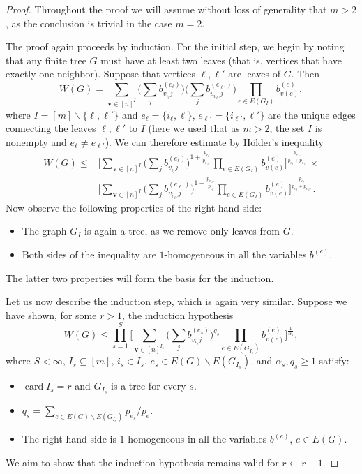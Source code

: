 \documentclass[10pt,reqno]{amsart}
\theoremstyle{definition}
\numberwithin{equation}{section}
\numberwithin{figure}{section}
\numberwithin{table}{section}
\newcommand{\card}{\mathop{\mathrm{card}}}
\begin{document}
\begin{proof}
Throughout the proof we will assume without loss of generality that 
$m>2$, as the conclusion is trivial in the case $m=2$.

The proof again proceeds by induction. For the initial step, we begin by 
noting that any finite tree $G$ must have at least two leaves (that is,
vertices that have exactly one neighbor). Suppose that vertices 
$\ell,\ell'$ are leaves of $G$. Then
$$
        W(G) =
        \sum_{\mathbf{v}\in[n]^{I}}
	\Bigg(
	\sum_j b_{v_{i_\ell}j}^{(e_\ell)}
	\Bigg)
	\Bigg(
	\sum_j b_{v_{i_{\ell'}}j}^{(e_{\ell'})}
	\Bigg)
        \prod_{e\in E(G_{I})}b_{v(e)}^{(e)},
$$
where $I=[m]\backslash\{\ell,\ell'\}$ and $e_\ell=\{i_\ell,\ell\}$, 
$e_{\ell'}=\{i_{\ell'},\ell'\}$ are the unique edges connecting the leaves
$\ell,\ell'$ to $I$ (here we used that as $m>2$, the set $I$ is nonempty 
and $e_\ell\ne e_{\ell'}$). We can 
therefore estimate by H\"older's inequality
\begin{align*}
	W(G) \le\mbox{} &
	\Bigg[
        \sum_{\mathbf{v}\in[n]^{I}}
	\Bigg(
	\sum_j b_{v_{i_\ell}j}^{(e_\ell)}
	\Bigg)^{ 1 + \frac{p_{e_\ell}}{p_{e_{\ell'}}} }
        \prod_{e\in E(G_{I})}b_{v(e)}^{(e)}
	\Bigg]^{ \frac{ p_{e_{\ell'}} }{ p_{e_\ell}+p_{e_{\ell'}} } }
	\times\mbox{}\\
	&\Bigg[
        \sum_{\mathbf{v}\in[n]^{I}}
	\Bigg(
	\sum_j b_{v_{i_{\ell'}}j}^{(e_{\ell'})}
	\Bigg)^{ 1 + \frac{p_{e_{\ell'}}}{p_{e_{\ell}}} }
        \prod_{e\in E(G_{I})}b_{v(e)}^{(e)}
	\bigg]^{ \frac{ p_{e_{\ell}} }{ p_{e_\ell}+p_{e_{\ell'}} } }.
\end{align*}
Now observe the following properties of the right-hand side:
\begin{itemize}[label=\textbullet, leftmargin=*]
\item The graph $G_{I}$ is again a tree, as we remove only leaves
from $G$.
\item Both sides of the inequality are $1$-homogeneous in all the 
variables $b^{(e)}$.
\end{itemize}
The latter two properties will form the basis for the induction.

Let us now describe the induction step, which is again very similar.
Suppose we have shown, for some $r>1$, the induction hypothesis
$$
	W(G) \le
	\prod_{s=1}^S
	\Bigg[
        \sum_{\mathbf{v}\in[n]^{I_s}}
	\Bigg(
	\sum_j b_{v_{i_s}j}^{(e_s)}
	\Bigg)^{q_s}
        \prod_{e\in E(G_{I_s})}b_{v(e)}^{(e)}
	\Bigg]^{\frac{1}{\alpha_s}},
$$
where $S<\infty$, $I_s\subseteq[m]$, $i_s\in I_s$, $e_s\in E(G)
\backslash E(G_{I_s})$, and $\alpha_s,q_s\ge 1$ satisfy:
\begin{itemize}[label=\textbullet, leftmargin=*]
\item $\card I_s=r$ and $G_{I_s}$ is a tree for every $s$.
\item $q_s = \sum_{e\in E(G)\backslash E(G_{I_s})}p_{e_s}/p_e$.
\item The right-hand side is $1$-homogeneous
in all the variables $b^{(e)}$, $e\in E(G)$.
\end{itemize}
We aim to show that the induction hypothesis remains valid for
$r\leftarrow r-1$.


\end{proof}
\end{document}
